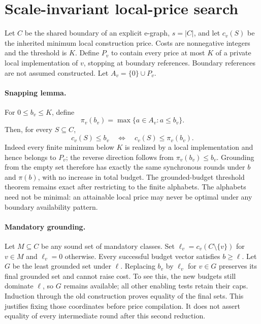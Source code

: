 \section{Scale-invariant local-price search}
Let $C$ be the shared boundary of an explicit e-graph, $s=|C|$, and let
$c_v(S)$ be the inherited minimum local construction price. Costs are
nonnegative integers and the threshold is $K$. Define $P_v$ to contain every
price at most $K$ of a private local implementation of $v$, stopping at
boundary references. Boundary references are not assumed constructed.
Let $A_v=\{0\}\cup P_v$.

\paragraph{Snapping lemma.}
For $0\leq b_v\leq K$, define
\[
 \pi_v(b_v)=\max\{a\in A_v:a\leq b_v\}.
\]
Then, for every $S\subseteq C$,
\[
 c_v(S)\leq b_v\quad\Longleftrightarrow\quad c_v(S)\leq\pi_v(b_v).
\]
Indeed every finite minimum below $K$ is realized by a local implementation
and hence belongs to $P_v$; the reverse direction follows from
$\pi_v(b_v)\leq b_v$. Grounding from the empty set therefore has exactly
the same synchronous rounds under $b$ and $\pi(b)$, with no increase in total
budget. The grounded-budget threshold theorem remains exact after restricting
to the finite alphabets. The alphabets need not be minimal: an attainable
local price may never be optimal under any boundary availability pattern.

\paragraph{Mandatory grounding.}
Let $M\subseteq C$ be any sound set of mandatory classes. Set
$\ell_v=c_v(C\setminus\{v\})$ for $v\in M$ and $\ell_v=0$ otherwise.
Every successful budget vector satisfies $b\geq\ell$.
Let $G$ be the least grounded set under $\ell$. Replacing $b_v$ by $\ell_v$
for $v\in G$ preserves its final grounded set and cannot raise cost.
To see this, the new budgets still dominate $\ell$, so $G$ remains available;
all other enabling tests retain their caps. Induction through the old
construction proves equality of the final sets. This justifies fixing those
coordinates before price compilation. It does not assert equality of every
intermediate round after this second reduction.


